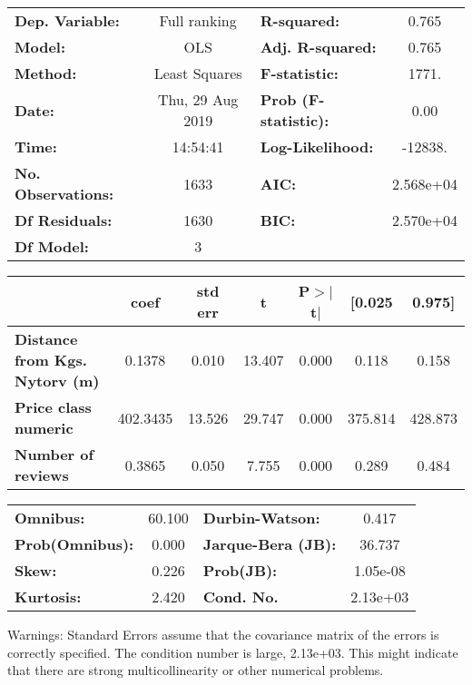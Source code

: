 \documentclass{report}
\begin{document}
\begin{center}
\begin{tabular}{lclc}
\toprule
\textbf{Dep. Variable:}                &   Full ranking   & \textbf{  R-squared:         } &     0.765   \\
\textbf{Model:}                        &       OLS        & \textbf{  Adj. R-squared:    } &     0.765   \\
\textbf{Method:}                       &  Least Squares   & \textbf{  F-statistic:       } &     1771.   \\
\textbf{Date:}                         & Thu, 29 Aug 2019 & \textbf{  Prob (F-statistic):} &     0.00    \\
\textbf{Time:}                         &     14:54:41     & \textbf{  Log-Likelihood:    } &   -12838.   \\
\textbf{No. Observations:}             &        1633      & \textbf{  AIC:               } & 2.568e+04   \\
\textbf{Df Residuals:}                 &        1630      & \textbf{  BIC:               } & 2.570e+04   \\
\textbf{Df Model:}                     &           3      & \textbf{                     } &             \\
\bottomrule
\end{tabular}
\begin{tabular}{lcccccc}
                                       & \textbf{coef} & \textbf{std err} & \textbf{t} & \textbf{P$>$$|$t$|$} & \textbf{[0.025} & \textbf{0.975]}  \\
\midrule
\textbf{Distance from Kgs. Nytorv (m)} &       0.1378  &        0.010     &    13.407  &         0.000        &        0.118    &        0.158     \\
\textbf{Price class numeric}           &     402.3435  &       13.526     &    29.747  &         0.000        &      375.814    &      428.873     \\
\textbf{Number of reviews}             &       0.3865  &        0.050     &     7.755  &         0.000        &        0.289    &        0.484     \\
\bottomrule
\end{tabular}
\begin{tabular}{lclc}
\textbf{Omnibus:}       & 60.100 & \textbf{  Durbin-Watson:     } &    0.417  \\
\textbf{Prob(Omnibus):} &  0.000 & \textbf{  Jarque-Bera (JB):  } &   36.737  \\
\textbf{Skew:}          &  0.226 & \textbf{  Prob(JB):          } & 1.05e-08  \\
\textbf{Kurtosis:}      &  2.420 & \textbf{  Cond. No.          } & 2.13e+03  \\
\bottomrule
\end{tabular}
\end{center}

Warnings: \newline
 [1] Standard Errors assume that the covariance matrix of the errors is correctly specified. \newline
 [2] The condition number is large, 2.13e+03. This might indicate that there are \newline
 strong multicollinearity or other numerical problems.
\end{document}
